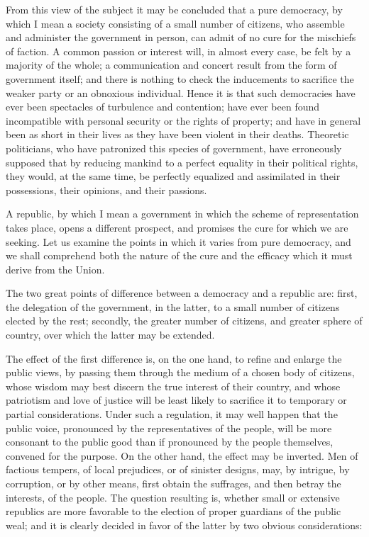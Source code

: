 From this view of the subject it may be concluded that a pure democracy, by which I mean a society consisting of a small number of citizens, who assemble and administer the government in person, can admit of no cure for the mischiefs of faction. A common passion or interest will, in almost every case, be felt by a majority of the whole; a communication and concert result from the form of government itself; and there is nothing to check the inducements to sacrifice the weaker party or an obnoxious individual. Hence it is that such democracies have ever been spectacles of turbulence and contention; have ever been found incompatible with personal security or the rights of property; and have in general been as short in their lives as they have been violent in their deaths. Theoretic politicians, who have patronized this species of government, have erroneously supposed that by reducing mankind to a perfect equality in their political rights, they would, at the same time, be perfectly equalized and assimilated in their possessions, their opinions, and their passions.

A republic, by which I mean a government in which the scheme of representation takes place, opens a different prospect, and promises the cure for which we are seeking. Let us examine the points in which it varies from pure democracy, and we shall comprehend both the nature of the cure and the efficacy which it must derive from the Union.

The two great points of difference between a democracy and a republic are: first, the delegation of the government, in the latter, to a small number of citizens elected by the rest; secondly, the greater number of citizens, and greater sphere of country, over which the latter may be extended.

The effect of the first difference is, on the one hand, to refine and enlarge the public views, by passing them through the medium of a chosen body of citizens, whose wisdom may best discern the true interest of their country, and whose patriotism and love of justice will be least likely to sacrifice it to temporary or partial considerations. Under such a regulation, it may well happen that the public voice, pronounced by the representatives of the people, will be more consonant to the public good than if pronounced by the people themselves, convened for the purpose. On the other hand, the effect may be inverted. Men of factious tempers, of local prejudices, or of sinister designs, may, by intrigue, by corruption, or by other means, first obtain the suffrages, and then betray the interests, of the people. The question resulting is, whether small or extensive republics are more favorable to the election of proper guardians of the public weal; and it is clearly decided in favor of the latter by two obvious considerations:

